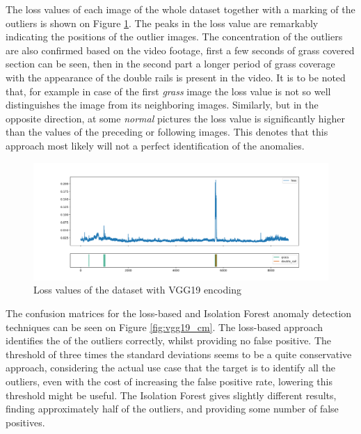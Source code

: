 The loss values of each image of the whole dataset together with a marking of the outliers is shown
on Figure \ref{fig:vgg19_loss}.
The peaks in the loss value are remarkably indicating the positions of the outlier images.
The concentration of the outliers are also confirmed based on the video footage, first a few seconds
of grass covered section can be seen, then in the second part a longer period of grass coverage
with the appearance of the double rails is present in the video.
It is to be noted that, for example in case of the first \emph{grass} image the loss value is not
so well distinguishes the image from its neighboring images.
Similarly, but in the opposite direction, at some \emph{normal} pictures the loss value is significantly
higher than the values of the preceding or following images.
This denotes that this approach most likely will not a perfect identification of the anomalies.

\begin{figure}[H]
    \centering
    \includegraphics[width=\textwidth,trim={0 1cm 0 1cm},clip]{./results/vgg19_vgg19/20230510_172958_feature_vectors_loss.png}
    \caption{Loss values of the dataset with VGG19 encoding}
    \label{fig:vgg19_loss}
\end{figure}

The confusion matrices for the loss-based and Isolation Forest anomaly detection techniques can be seen
on Figure \ref{fig:vgg19_cm}.
The loss-based approach identifies the \small {} of the outliers correctly,
whilst providing no false positive.
The threshold of three times the standard deviations seems to be a quite conservative approach,
considering the actual use case that the target is to identify all the outliers, even with the cost
of increasing the false positive rate, lowering this threshold might be useful.
The Isolation Forest gives slightly different results, finding approximately half of the outliers,
and providing some number of false positives.

